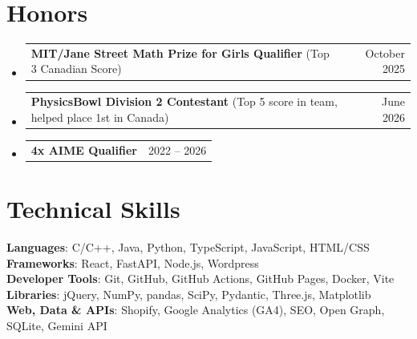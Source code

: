 \documentclass[letterpaper,11pt]{article}
\makeatletter
\newcommand{\resumeProjectHeading}[2]{
    \item
    \begin{tabular*}{0.97\textwidth}{l@{\extracolsep{\fill}}r}
      \small#1 & #2 \\
    \end{tabular*}\vspace{-7pt}
}
\newcommand{\resumeSubHeadingListStart}{\begin{itemize}[leftmargin=0.15in, label={}]}
\newcommand{\resumeSubHeadingListEnd}{\end{itemize}}
\makeatother
\begin{document}
\section{Honors}
    \resumeSubHeadingListStart
      \resumeProjectHeading
          {\textbf{MIT/Jane Street Math Prize for Girls Qualifier} (Top 3 Canadian Score)}{October 2025}
      \resumeProjectHeading
          {\textbf{PhysicsBowl Division 2 Contestant} (Top 5 score in team, helped place 1st in Canada)}{June 2026}
      \resumeProjectHeading
          {\textbf{4x AIME Qualifier}}{2022 -- 2026}
    \resumeSubHeadingListEnd

\section{Technical Skills}
 \begin{itemize}[leftmargin=0.15in, label={}]
    \small{\item{
     \textbf{Languages}{: C/C++, Java, Python, TypeScript, JavaScript, HTML/CSS} \\
     \textbf{Frameworks}{: React, FastAPI, Node.js, Wordpress} \\
     \textbf{Developer Tools}{: Git, GitHub, GitHub Actions, GitHub Pages, Docker, Vite} \\
     \textbf{Libraries}{: jQuery, NumPy, pandas, SciPy, Pydantic, Three.js, Matplotlib} \\
     \textbf{Web, Data \& APIs}{: Shopify, Google Analytics (GA4), SEO, Open Graph, SQLite, Gemini API}
    }}
 \end{itemize}

\end{document}

